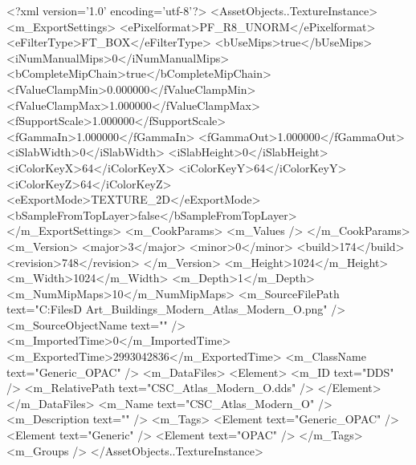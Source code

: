 <?xml version='1.0' encoding='utf-8'?>
<AssetObjects..TextureInstance>
  <m_ExportSettings>
    <ePixelformat>PF_R8_UNORM</ePixelformat>
    <eFilterType>FT_BOX</eFilterType>
    <bUseMips>true</bUseMips>
    <iNumManualMips>0</iNumManualMips>
    <bCompleteMipChain>true</bCompleteMipChain>
    <fValueClampMin>0.000000</fValueClampMin>
    <fValueClampMax>1.000000</fValueClampMax>
    <fSupportScale>1.000000</fSupportScale>
    <fGammaIn>1.000000</fGammaIn>
    <fGammaOut>1.000000</fGammaOut>
    <iSlabWidth>0</iSlabWidth>
    <iSlabHeight>0</iSlabHeight>
    <iColorKeyX>64</iColorKeyX>
    <iColorKeyY>64</iColorKeyY>
    <iColorKeyZ>64</iColorKeyZ>
    <eExportMode>TEXTURE_2D</eExportMode>
    <bSampleFromTopLayer>false</bSampleFromTopLayer>
  </m_ExportSettings>
  <m_CookParams>
    <m_Values />
  </m_CookParams>
  <m_Version>
    <major>3</major>
    <minor>0</minor>
    <build>174</build>
    <revision>748</revision>
  </m_Version>
  <m_Height>1024</m_Height>
  <m_Width>1024</m_Width>
  <m_Depth>1</m_Depth>
  <m_NumMipMaps>10</m_NumMipMaps>
  <m_SourceFilePath text="C:\Users\Shadow\Desktop\Working Files\3D Art\Textures\CSC_Buildings_Modern\Current\textures\CSC_Atlas_Modern_O.png" />
  <m_SourceObjectName text="" />
  <m_ImportedTime>0</m_ImportedTime>
  <m_ExportedTime>2993042836</m_ExportedTime>
  <m_ClassName text="Generic_OPAC" />
  <m_DataFiles>
    <Element>
      <m_ID text="DDS" />
      <m_RelativePath text="CSC_Atlas_Modern_O.dds" />
    </Element>
  </m_DataFiles>
  <m_Name text="CSC_Atlas_Modern_O" />
  <m_Description text="" />
  <m_Tags>
    <Element text="Generic_OPAC" />
    <Element text="Generic" />
    <Element text="OPAC" />
  </m_Tags>
  <m_Groups />
</AssetObjects..TextureInstance>